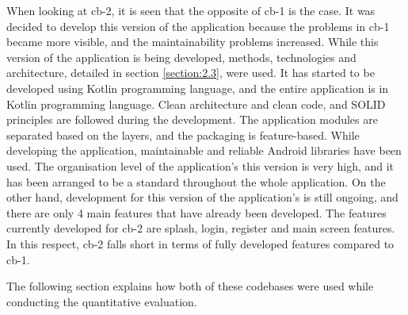 When looking at cb-2, it is seen that the opposite of cb-1 is the case. It was decided to develop this version of the application because the problems in cb-1 became more visible, and the maintainability problems increased. While this version of the application is being developed, methods, technologies and architecture, detailed in section \ref{section:2.3}, were used. It has started to be developed using Kotlin programming language, and the entire application is in Kotlin programming language.  Clean architecture and clean code, and SOLID principles are followed during the development. The application modules are separated based on the layers, and the packaging is feature-based. While developing the application, maintainable and reliable Android libraries have been used. The organisation level of the application's this version is very high, and it has been arranged to be a standard throughout the whole application. On the other hand,  development for this version of the application's is still ongoing, and there are only 4 main features that have already been developed. The features currently developed for cb-2 are splash, login, register and main screen features. In this respect, cb-2 falls short in terms of fully developed features compared to cb-1.

The following section explains how both of these codebases were used while conducting the quantitative evaluation.



